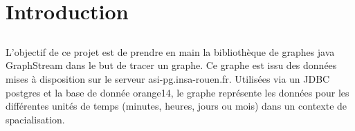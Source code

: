 \chapter{Introduction}

\section*{}
L'objectif de ce projet est de prendre en main la bibliothèque de graphes java GraphStream dans le but de tracer un graphe. Ce graphe est issu des données mises à disposition sur le serveur asi-pg.insa-rouen.fr. Utilisées via un JDBC postgres et la base de donnée orange14, le graphe représente les données pour les différentes unités de temps (minutes, heures, jours ou mois) dans un contexte de spacialisation.
\section*{}
